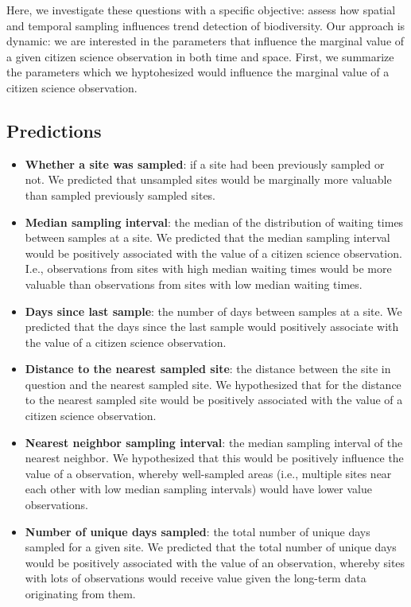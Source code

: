 \documentclass[9pt,twocolumn,twoside,lineno]{pnas-new}
\begin{document}
Here, we investigate these questions with a specific objective: assess how spatial and temporal sampling influences trend detection of biodiversity. Our approach is dynamic: we are interested in the parameters that influence the marginal value of a given citizen science observation in both time and space. First, we summarize the parameters which we hyptohesized would influence the marginal value of a citizen science observation.

\subsection*{Predictions}

\begin{itemize}
  \item \textbf{Whether a site was sampled}: if a site had been previously sampled or not. We predicted that unsampled sites would be marginally more valuable than sampled previously sampled sites.
  \item \textbf{Median sampling interval}: the median of the distribution of waiting times between samples at a site. We predicted that the median sampling interval would be positively associated with the value of a citizen science observation. I.e., observations from sites with high median waiting times would be more valuable than observations from sites with low median waiting times.
  \item \textbf{Days since last sample}: the number of days between samples at a site. We predicted that the days since the last sample would positively associate with the value of a citizen science observation.
  \item \textbf{Distance to the nearest sampled site}: the distance between the site in question and the nearest sampled site. We hypothesized that for the distance to the nearest sampled site would be positively associated with the value of a citizen science observation.
  \item \textbf{Nearest neighbor sampling interval}: the median sampling interval of the nearest neighbor. We hypothesized that this would be positively influence the value of a observation, whereby well-sampled areas (i.e., multiple sites near each other with low median sampling intervals) would have lower value observations.
  \item \textbf{Number of unique days sampled}: the total number of unique days sampled for a given site. We predicted that the total number of unique days would be positively associated with the value of an observation, whereby sites with lots of observations would receive value given the long-term data originating from them.
\end{itemize}
\end{document}
